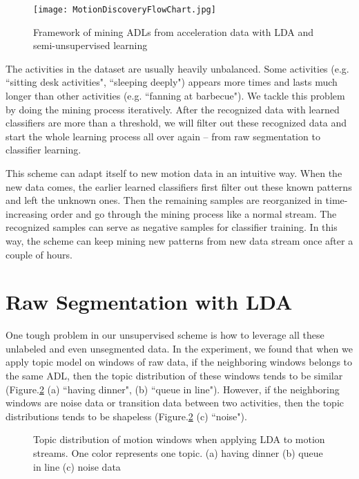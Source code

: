 \documentclass{sigchi}
\begin{document}
    \begin{figure}
     \texttt{[image: MotionDiscoveryFlowChart.jpg]}
        \caption{Framework of mining ADLs from acceleration data with LDA and semi-unsupervised learning }
        \label{fig: flowchart}
    \end{figure}

    The activities in the dataset are usually heavily unbalanced.
    Some activities (e.g. ``sitting desk activities", ``sleeping deeply") appears more times and lasts much longer than other activities (e.g. ``fanning at barbecue").
    We tackle this problem by doing the mining process iteratively.
    After the recognized data with learned classifiers are more than a threshold, we will filter out these recognized data and start the whole learning process all over again -- from raw segmentation to classifier learning.

    This scheme can adapt itself to new motion data in an intuitive way.
    When the new data comes, the earlier learned classifiers first filter out these known patterns and left the unknown ones.
    Then the remaining samples are reorganized in time-increasing order and go through the mining process like a normal stream.
    The recognized samples can serve as negative samples for classifier training.
    In this way, the scheme can keep mining new patterns from new data stream once after a couple of hours.

\section{Raw Segmentation with LDA}
 \label{sec.segmentation}

 One tough problem in our unsupervised scheme is how to leverage all these unlabeled and even unsegmented data.
 In the experiment, we found that when we apply topic model on windows of raw data, if the neighboring windows belongs to the same ADL, then the topic distribution of these windows tends to be similar (Figure.\ref{fig: tm-intuition} (a) ``having dinner", (b) ``queue in line").
 However, if the neighboring windows are noise data or transition data between two activities, then the topic distributions tends to be shapeless (Figure.\ref{fig: tm-intuition} (c) ``noise").

\begin{figure}
    \caption{Topic distribution of motion windows when applying LDA to motion streams. One color represents one topic. (a) having dinner (b) queue in line (c) noise data }
    \label{fig: tm-intuition}
\end{figure}
\end{document}
